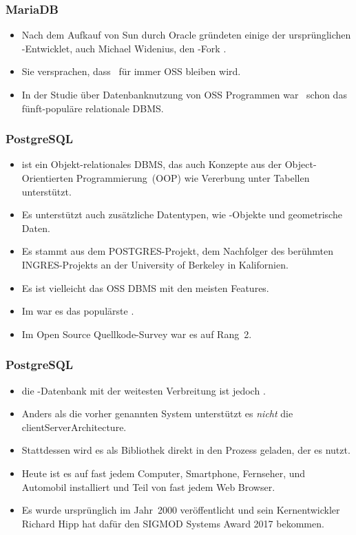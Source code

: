 \documentclass[aspectratio=169,mathserif,notheorems]{beamer}%
\begin{document}
%
\begin{frame}%
\frametitle{MariaDB}%
\begin{itemize}%
\item Nach dem Aufkauf von Sun durch Oracle gründeten einige der ursprünglichen \mysql-Entwicklet, auch Michael Widenius, den \mysql-Fork \mariadb\cite{R2014MM,B2019LTMEELFFSAA,D2015LMAM,AA2018QAWMV1ITSQ,AA2018QAWMV2IDQ}.%
\item<2-> Sie versprachen, dass \mariadb\ für immer OSS bleiben wird.%
\item<3-> In der Studie\cite{PMPVEPWGSMB2025ATAODMSTTHOOSP} über Datenbanknutzung von  OSS Programmen war \mariadb\ schon das fünft-populäre relationale DBMS.%
\end{itemize}%
%
%
\end{frame}%
%
\begin{frame}[t]%
\frametitle{PostgreSQL}%
\begin{itemize}%
\item \postgresql\cite{TA2024DDAMWPAM,FP2023LP,OH2017PUAR,B2024PELUYDW} ist ein Objekt-relationales DBMS, das auch Konzepte aus der Object-Orientierten Programmierung~(OOP) wie Vererbung unter Tabellen unterstützt.
\item<2-> Es unterstützt auch zusätzliche Datentypen, wie -Objekte und geometrische Daten.
\item<3-> Es stammt aus dem POSTGRES-Projekt, dem Nachfolger des berühmten INGRES-Projekts an der University of Berkeley in Kalifornien\cite{C20245YOQ}.%
\item<4-> Es ist vielleicht das OSS DBMS mit den meisten Features.%
\item<5-> Im  war es das populärste \cite{SE:SO:2024DS}.
\item<6-> Im Open Source Quellkode-Survey\cite{PMPVEPWGSMB2025ATAODMSTTHOOSP} war es auf Rang~2.
\end{itemize}%
%
%
\end{frame}%
%
\begin{frame}[t]%
\frametitle{PostgreSQL}%
\begin{itemize}%
\item die -Datenbank mit der weitesten Verbreitung ist jedoch \sqlite\cite{WB2019RHSOOS,GPBHKP2022SPPAF,C20245YOQ,HWACIS:HO2023WKUOS}.%
\item<2-> Anders als die vorher genannten System unterstützt es \emph{nicht} die \gls{clientServerArchitecture}.%
\item<3-> Stattdessen wird es als Bibliothek direkt in den Prozess geladen, der es nutzt.%
\item<4-> Heute ist es auf fast jedem Computer, Smartphone, Fernseher, und Automobil installiert und Teil von fast jedem Web Browser.%
\item<5-> Es wurde ursprünglich im Jahr~2000 veröffentlicht und sein Kernentwickler Richard Hipp hat dafür den SIGMOD Systems Award 2017 bekommen\cite{C20245YOQ}.%
\end{itemize}%
%
%
\end{frame}%
\end{document}
